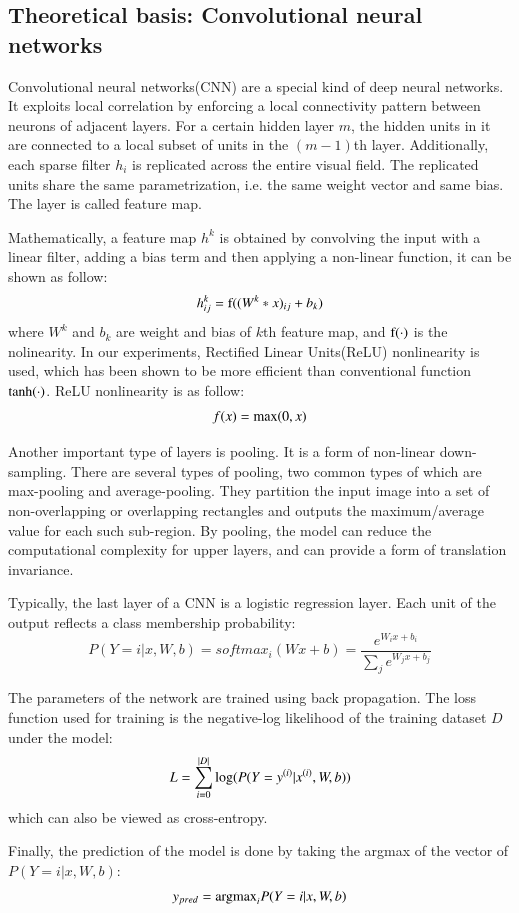 \documentclass{article} %
\begin{document}
\subsection{Theoretical basis: Convolutional neural networks}
Convolutional neural networks(CNN) are a special kind of deep neural networks. It exploits local correlation by enforcing a local connectivity pattern between neurons of adjacent layers. For a certain hidden layer $m$, the hidden units in it are connected to a local subset of units in the $(m-1)$th layer. Additionally, each sparse filter $h_{i}$ is replicated across the entire visual field. The replicated units share the same parametrization, i.e. the same weight vector and same bias. The layer is called feature map. 
\par
Mathematically, a feature map $h^{k}$ is obtained by convolving the input with a linear filter, adding a bias term and then applying a non-linear function, it can be shown as follow:
\begin{equation}
h^{k}_{ij}=\textup{f}((W^{k}*x)_{ij}+b_{k})
\end{equation}
where $W^{k}$ and $b_{k}$ are weight and bias of $k$th feature map, and $\textup{f}(\cdot)$ is the nolinearity. In our experiments, Rectified Linear Units(ReLU) nonlinearity is used, which has been shown to be more efficient than conventional function $\textup{tanh}(\cdot)$.\cite{imagenet} ReLU nonlinearity is as follow:
\begin{equation}
f(x)=\textup{max}(0,x)
\end{equation}
\par
Another important type of layers is pooling. It is a form of non-linear down-sampling. There are several types of pooling, two common types of which are max-pooling and average-pooling. They partition the input image into a set of non-overlapping or overlapping rectangles and outputs the maximum/average value for each such sub-region. By pooling, the model can reduce the computational complexity for upper layers, and can provide a form of translation invariance. 
\par
Typically, the last layer of a CNN is a logistic regression layer. Each unit of the output reflects a class membership probability:
\begin{equation}
P(Y=i|x,W,b)=softmax_{i}(Wx+b)=\frac{e^{W_{i}x+b_{i}}}{\sum _{j}e^{W_{j}x+b_{j}}} 
\end{equation}
\par
The parameters of the network are trained using back propagation\cite{backprop}. The loss function used for training is the negative-log likelihood of the training dataset $D$ under the model:
\begin{equation}
L = \sum_{i=0}^{|D|}\textup{log}(P(Y=y^{(i)}|x^{(i)},W,b))
\end{equation}
which can also be viewed as cross-entropy.
\par
Finally, the prediction of the model is done by taking the argmax of the vector of $P(Y=i|x,W,b)$:
\begin{equation}
y_{pred}=\textup{argmax}_{i}P(Y=i|x,W,b)
\end{equation}
\end{document}
